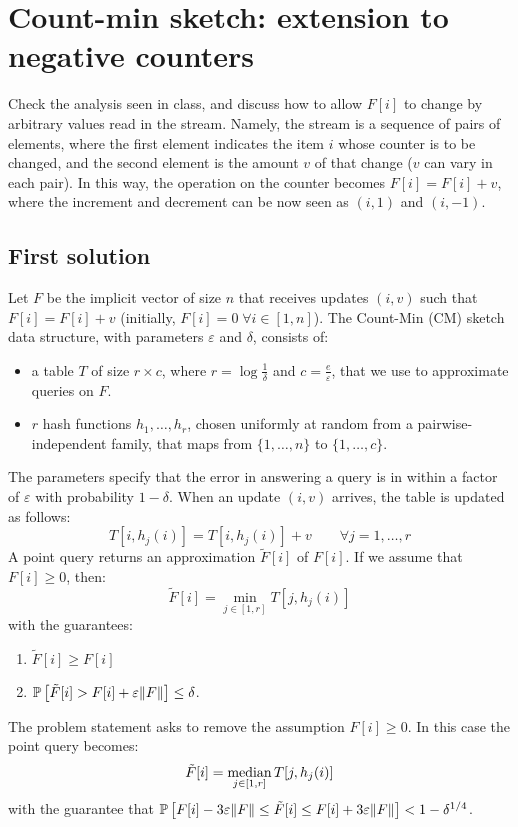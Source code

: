 \section{Count-min sketch: extension to negative counters}

Check the analysis seen in class, and discuss how to allow $F[i]$ to change by arbitrary
values read in the stream.
Namely, the stream is a sequence of pairs of elements, where the first element indicates the
item $i$ whose counter is to be changed, and the second element is the amount $v$ of that
change ($v$ can vary in each pair).
In this way, the operation on the counter becomes $F[i] = F[i] + v$, where the increment
and decrement can be now seen as $(i, 1)$ and $(i, -1)$.


\subsection{First solution}

Let $F$ be the implicit vector of size $n$ that receives updates $(i, v)$ such that $F[i]=F[i]+v$ (initially, $F[i]=0 \; \forall i \in [1, n]$).
The Count-Min (CM) sketch data structure, with parameters $\varepsilon$ and $\delta$, consists of:
\begin{itemize}
  \item a table $T$ of size $r\times c$, where $r=\log\frac{1}{\delta}$ and $c=\frac{e}{\varepsilon}$, that we use to approximate queries on $F$.
  \item $r$ hash functions $h_1, \dots, h_r$, chosen uniformly at random from a pairwise-independent family, that maps from $\{1,\dots,n\}$ to $\{1,\dots,c\}$.
\end{itemize}
The parameters specify that the error in answering a query is in within a factor of $\varepsilon$ with probability $1-\delta$.
When an update $(i, v)$ arrives, the table is updated as follows: 
$$ T[i, h_j(i)] = T[i, h_j(i)] + v \qquad \forall j = 1, \dots, r $$ 
A point query returns an approximation $\tilde{F}[i]$ of $F[i]$. If we assume that $F[i] \geq 0$, then:
$$\tilde{F}[i]=\min_{j\in[1,r]} T[j, h_j(i)]$$ with the guarantees:
\begin{enumerate}
  \item $\tilde{F}[i]\geq F[i]$ 
  \item $\operatorname*{\mathbb{P}}\left[{\tilde{F}[i]>F[i]+\varepsilon\lVert F\rVert}\right]\le\delta$.
\end{enumerate}

The problem statement asks to remove the assumption $F[i]\geq 0$. In this case the point query becomes: 
$$\tilde{F}[i]=\operatorname*{median}_{j\in[1,r]} T[j, h_j(i)]$$
with the guarantee that $\operatorname*{\mathbb{P}}\left[{F[i]-3\varepsilon\lVert F\rVert \leq \tilde{F}[i] \leq F[i]+3\varepsilon\lVert F\rVert}\right] < 1-\delta^{1/4}$.

